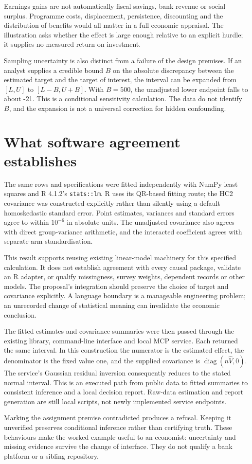 Earnings gains are not automatically fiscal savings, bank revenue or social
surplus. Programme costs, displacement, persistence, discounting and the
distribution of benefits would all matter in a full economic appraisal.
The illustration asks whether the effect is large enough relative to an
explicit hurdle; it supplies no measured return on investment.

Sampling uncertainty is also distinct from a failure of the design premises.
If an analyst supplies a credible bound $B$ on the absolute discrepancy
between the estimated target and the target of interest, the interval can be
expanded from $[L,U]$ to $[L-B,U+B]$. With $B=500$, the unadjusted lower
endpoint falls to about -21. This is a conditional sensitivity calculation.
The data do not identify $B$, and the expansion is not a universal correction
for hidden confounding.

\section{What software agreement establishes}
The same rows and specifications were fitted independently with NumPy least
squares and R 4.1.2's \texttt{stats::lm}. R uses its QR-based fitting route;
the HC2 covariance was constructed explicitly rather than silently using a
default homoskedastic standard error. Point estimates, variances and standard
errors agree to within $10^{-6}$ in absolute units. The unadjusted covariance
also agrees with direct group-variance arithmetic, and the interacted
coefficient agrees with separate-arm standardisation. \citep{gap29r}

This result supports reusing existing linear-model machinery for this
specified calculation. It does not establish agreement with every causal
package, validate an R adapter, or qualify missingness, survey weights,
dependent records or other models. The proposal's integration should preserve
the choice of target and covariance explicitly. A language boundary is a
manageable engineering problem; an unrecorded change of statistical meaning
can invalidate the economic conclusion.

The fitted estimates and covariance summaries were then passed through the
existing library, command-line interface and local MCP service. Each returned
the same interval. In this construction the numerator is the estimated effect,
the denominator is the fixed value one, and the supplied covariance is
$\operatorname{diag}(n\widehat V,0)$. The service's Gaussian residual
inversion consequently reduces to the stated normal interval. This is an
executed path from public data to fitted summaries to consistent inference
and a local decision report. Raw-data estimation and report generation are
still local scripts, not newly implemented service endpoints.

Marking the assignment premise contradicted produces a refusal. Keeping it
unverified preserves conditional inference rather than certifying truth.
These behaviours make the worked example useful to an economist: uncertainty
and missing evidence survive the change of interface. They do not qualify a
bank platform or a sibling repository.

